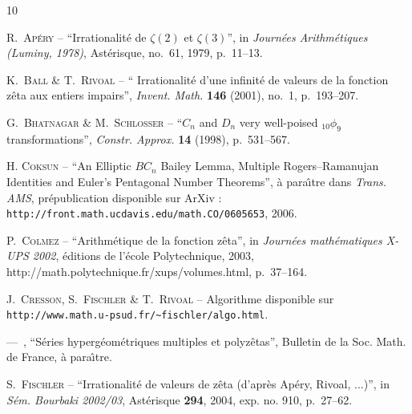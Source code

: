 \documentclass[12pt,francais, reqno]{smfart}
\numberwithin{equation}{section}
\begin{document}
\newcommand{\url}{\texttt}
\providecommand{\bysame}{\leavevmode ---\ }
\providecommand{\og}{``}
\providecommand{\fg}{''}
\providecommand{\smfandname}{\&}
\providecommand{\smfedsname}{\'eds.}
\providecommand{\smfedname}{\'ed.}
\providecommand{\smfmastersthesisname}{M\'emoire}
\providecommand{\smfphdthesisname}{Th\`ese}
\begin{thebibliography}{10}

{\scshape R.~Ap{\'e}ry} -- {\og Irrationalit\'e de $\zeta(2)$ et
  $\zeta(3)$\fg}, in \emph{Journ{\'e}es Arithm{\'e}tiques (Luminy, 1978)},
  Ast{\'e}risque, no.~61, 1979, p.~11--13.

{\scshape K.~Ball {\normalfont \smfandname} T.~Rivoal} -- {\og
  Irrationalit{\'e} d'une infinit{\'e} de valeurs de la fonction z\^eta aux
  entiers impairs\fg}, \emph{Invent. Math.} \textbf{146} (2001), no.~1,
  p.~193--207.
  
{\scshape G.~Bhatnagar {\normalfont \smfandname} M.~Schlosser} -- {\og $C_n$ and $D_n$ very well-poised ${}_{10}\phi_9$ transformations\fg}, \emph{Constr. Approx.} \textbf{14} (1998), p.~531--567.
 

{\scshape H. Coksun} -- {\og An Elliptic $BC_n$ Bailey Lemma, Multiple Rogers--Ramanujan Identities and Euler's Pentagonal Number Theorems\fg}, \`a para{\^\i}tre dans \emph{Trans. AMS}, 
pr\'epublication disponible sur ArXiv : 
\\
{\tt{http\!\!://front.math.ucdavis.edu/math.CO/0605653}}, 2006.

{\scshape P.~Colmez} -- {\og Arithm{\'e}tique de la fonction z\^eta\fg}, in
  \emph{Journ{\'e}es math{\'e}matiques X-UPS 2002}, {\'e}ditions de l'{\'e}cole
  Polytechnique, 2003, http://math.polytechnique.fr/xups/volumes.html,
  p.~37--164.

{\scshape J.~Cresson, S.~Fischler {\normalfont \smfandname} T.~Rivoal} --
  Algorithme disponible sur\\
  {\tt{http\!\!://www.math.u-psud.fr/\~{}fischler/algo.html}}.

\bysame , {\og S\'eries hyperg\'eom\'etriques multiples et polyz\^etas\fg},
 Bulletin de la Soc. Math. de France, \`a para\^{\i}tre. 

{\scshape S.~Fischler} -- {\og Irrationalit{\'e} de valeurs de z\^eta
  (d'apr\`es {A}p{\'e}ry, {R}ivoal, ...)\fg}, in \emph{S{\'e}m. Bourbaki
  2002/03}, Ast{\'e}risque \textbf{294}, 2004, exp. no. 910, p.~27--62.


\end{thebibliography}
\end{document}
